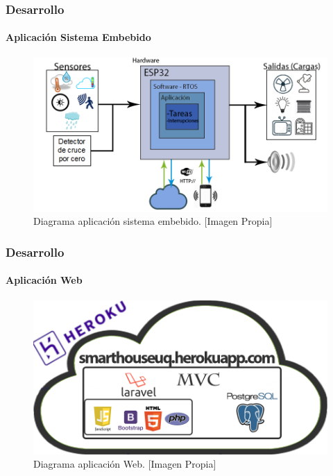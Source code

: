 \begin{frame}[t]
\frametitle{Desarrollo}
\framesubtitle{Aplicación Sistema Embebido}

\begin{figure}
	\centering
	\caption{Diagrama aplicación sistema embebido. [Imagen Propia]}
	\label{fig:baplicacion}
	\includegraphics[width=0.7\linewidth]{Imagenes/B_Aplicacion}
\end{figure}


\end{frame}

\begin{frame}[t]
\frametitle{Desarrollo}
\framesubtitle{Aplicación Web}

\begin{figure}
	\centering
	\caption{Diagrama aplicación Web. [Imagen Propia]}
	\label{fig:bappweb}
	\includegraphics[width=0.7\linewidth]{Imagenes/B_ImplAPPweb}
\end{figure}


\end{frame}